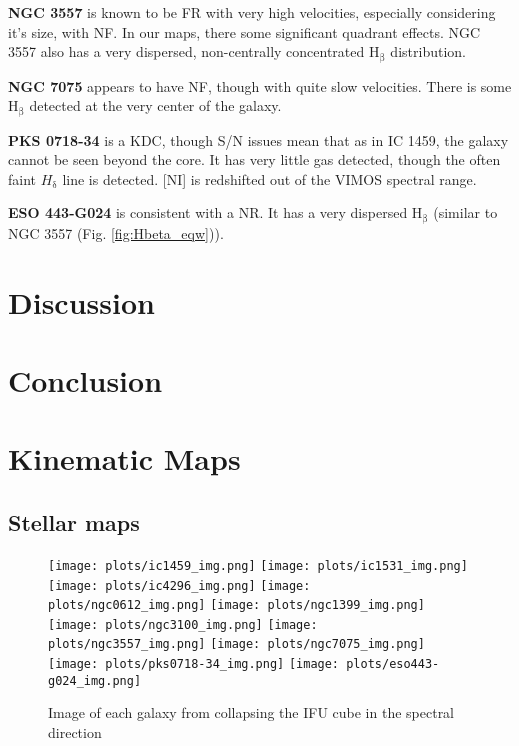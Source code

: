 \documentclass[fleqn,usenatbib,useAMS]{mnras}
\begin{document}
	\textbf{NGC 3557} is known to be FR with very high velocities, especially considering it's size, with NF. In our maps, there some significant quadrant effects. NGC 3557 also has a very dispersed, non-centrally concentrated H$_\mathrm{\beta}$ distribution. 

	\textbf{NGC 7075} appears to have NF, though with quite slow velocities. There is some H$_\mathrm{\beta}$ detected at the very center of the galaxy. 

	\textbf{PKS 0718-34} is a KDC, though S/N issues mean that as in IC 1459, the galaxy cannot be seen beyond the core. It has very little gas detected, though the often faint $H_\mathrm{\delta}$ line is detected. [NI] is redshifted out of the VIMOS spectral range.

	\textbf{ESO 443-G024} is consistent with a NR. It has a very dispersed H$_\mathrm{\beta}$ (similar to NGC 3557 (Fig. \ref{fig:Hbeta_eqw})).


	


\section{Discussion}
	\label{sec:discuss}

\section{Conclusion}
	\label{sec:conc}


%

{}

\appendix

\section{Kinematic Maps}
	\label{sec:kinmaps}
	\subsection{Stellar maps}
		\label{subsec:stellarmaps}
		\begin{figure*}
			\centering
			\texttt{[image: plots/ic1459\_img.png]}
			\texttt{[image: plots/ic1531\_img.png]}
			\texttt{[image: plots/ic4296\_img.png]}
			\texttt{[image: plots/ngc0612\_img.png]}
			\texttt{[image: plots/ngc1399\_img.png]}
			\texttt{[image: plots/ngc3100\_img.png]}
			\texttt{[image: plots/ngc3557\_img.png]}
			\texttt{[image: plots/ngc7075\_img.png]}
			\texttt{[image: plots/pks0718-34\_img.png]}
			\texttt{[image: plots/eso443-g024\_img.png]}
			\caption{Image of each galaxy from collapsing the IFU cube in the spectral direction}
			\label{fig:image}
		\end{figure*}
\end{document}
